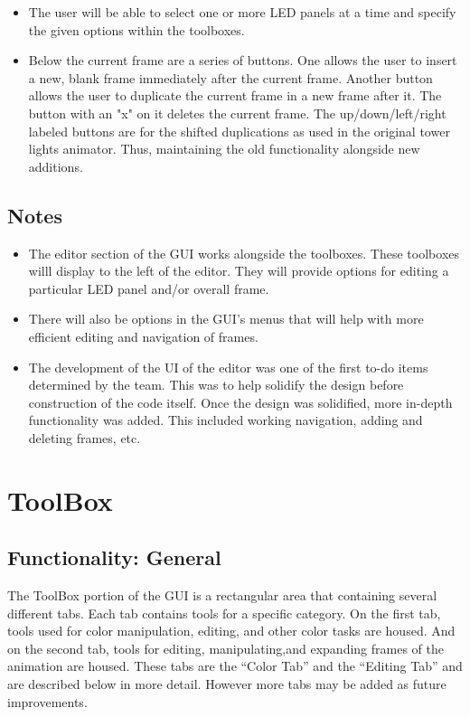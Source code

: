 \documentclass[12pt]{extarticle}
\begin{document}
\begin{itemize}
\begin{itemize}
			\item The user will be able to select one or more LED panels at a time and specify the given options within the toolboxes.
			\item Below the current frame are a series of buttons. One allows the user to insert a new, blank frame immediately after the current frame. Another button allows the user to duplicate the current frame in a new frame after it.  The button with an "x" on it deletes the current frame.  The up/down/left/right labeled buttons are for the shifted duplications as used in the original tower lights animator.  Thus, maintaining the old functionality alongside new additions. 
		\end{itemize}
	\end{itemize}
	
	\subsection{Notes}
	\begin{itemize}
		\item The editor section of the GUI  works alongside the toolboxes. These toolboxes willl display to the left of the editor. They will provide options for editing a particular LED panel and/or overall frame. %
		\item There will also be options in the GUI's menus that will help with more efficient editing and navigation of frames.
		\item The development of the UI of the editor was one of the first to-do items determined by the team.  This was to help solidify the design before construction of the code itself. Once the design was solidified, more in-depth functionality was added.  This included working navigation, adding and deleting frames, etc.
	\end{itemize}
	
\clearpage
\section{ToolBox} \label{toolbox}
	
	\subsection{Functionality: General}
	The ToolBox portion of the GUI is a rectangular area that containing several different tabs. Each tab contains tools for a specific category.  On the first tab, tools used for color manipulation, editing, and other color tasks are housed.  And on the second tab, tools for editing, manipulating,and expanding frames of the animation are housed. These tabs are the “Color Tab” and the “Editing Tab” and are described below in more detail. However more tabs may be added as future improvements.
\end{document}

